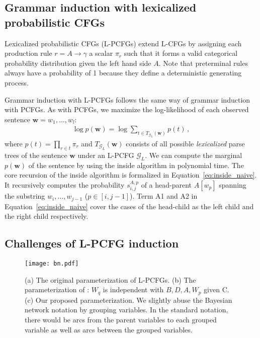 \documentclass[11pt,a4paper]{article}
\newcommand{\mb}{\mathbf}
\newcommand{\mbs}{\boldsymbol}
\begin{document}
\subsection{Grammar induction with lexicalized probabilistic CFGs}

Lexicalized probabilistic CFGs (L-PCFGs) extend L-CFGs by assigning each production rule $r=A\rightarrow\gamma$ a scalar $\pi_r$ such that it forms a valid categorical probability distribution given the left hand side $A$.
Note that preterminal rules always have a probability of 1 because they define a deterministic generating process.

Grammar induction with L-PCFGs follows the same way of grammar induction with PCFGs.
As with PCFGs, we maximize the log-likelihood of each observed sentence $\mbs{w}=w_1,\ldots,w_l$:
\begin{align}
	\log p(\mbs{w}) = \log \sum_{t\in T_{\mathcal{G}_{L}}(\mbs{w})}  p(t)\,,
\end{align}
where $p(t) = \prod_{r\in t}\pi_r$ and $T_{\mathcal{G}_{L}}(\mbs{w})$ consists of all possible \emph{lexicalized} parse trees of the sentence $\mbs{w}$ under an L-PCFG $\mathcal{G}_{L}$.
We can compute the marginal $p(\mb{w})$ of the sentence by using the inside algorithm in polynomial time.
The core recursion of the inside algorithm is formalized in Equation~\ref{eq:inside_naive}.
It recursively computes the probability $s_{i, j}^{A, p}$ of a head-parent $A[w_p]$ spanning the substring $w_i,\ldots,w_{j-1}$ ($p\in[i, j-1]$).
Term A1 and A2 in Equation~\ref{eq:inside_naive} cover the cases of the head-child as the left child and the right child respectively.

\subsection{Challenges of L-PCFG induction}
\begin{figure*}[tb]
	\centering
	\texttt{[image: bn.pdf]}
	\caption{(a) The original parameterization of L-PCFGs. (b) The parameterization of \citet{zhu-etal-2020-return}: $W_q$ is independent with $B,D,A,W_p$ given C. (c) Our proposed parameterization. 
	We slightly abuse the Bayesian network notation by grouping variables. In the standard notation, there would be arcs from the parent variables to each grouped variable as well as arcs between the grouped variables.}
	\label{fig:bayesnet}
\end{figure*}
\end{document}

